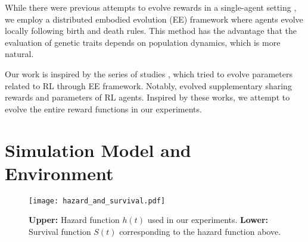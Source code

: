 While there were previous attempts to evolve rewards in a single-agent setting \citep{singhWhereRewardsCome2009,niekumEvolutionRewardFunctions2011,zhengWhatCanLearned2020},
we employ a distributed embodied evolution (EE) framework \citep{watsonEmbodiedEvolutionDistributing2002,bredecheEmbodiedEvolutionCollective2018}
where agents evolve locally following birth and death rules. This method has the advantage that the evaluation of genetic traits depends on population dynamics, which is more natural.

Our work is inspired by the series of studies \citep{elfwingBiologicallyInspiredEmbodied2005,elfwingDarwinianEmbodiedEvolution2011,elfwingEmergencePolymorphicMating2014}, which tried to evolve parameters related to RL through EE framework. Notably, \citet{elfwingDarwinianEmbodiedEvolution2011} evolved supplementary sharing rewards and parameters of RL agents.
Inspired by these works, we attempt to evolve the entire reward functions in our experiments.

\section{Simulation Model and Environment}\label{sec:method}

\begin{figure}[t]
  \centering{}
  \texttt{[image: hazard\_and\_survival.pdf]}
  \caption{
    \textbf{Upper:} Hazard function $h(t)$ used in our experiments.
    \textbf{Lower:} Survival function $S(t)$ corresponding to the hazard function above.
  }\label{figure:hs}
\end{figure}

